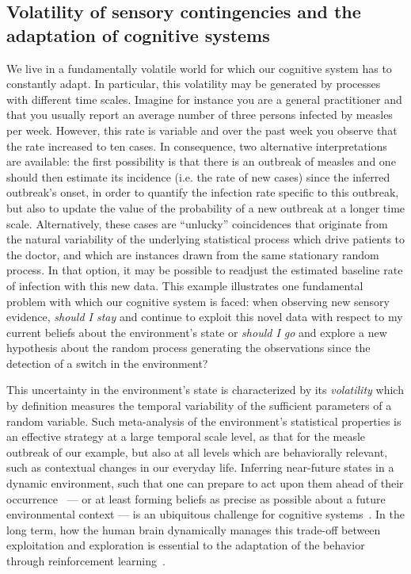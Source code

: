 \documentclass[10pt,letterpaper]{article}
\newcommand{\citep}[1]{\cite{#1}}
\newcommand{\LP}[1]{\textbf{\textcolor{red}{[LP: #1]}}}
\newcommand{\Rone}[1]{\textbf{\textcolor{magenta}{[rev 1: #1]}}}
\begin{document}
\subsection{Volatility of sensory contingencies and the adaptation of cognitive systems}
We live in a fundamentally volatile world for which
our cognitive system has to constantly adapt.
In particular, this volatility may be generated
by processes with different time scales.
Imagine for instance you are a general practitioner and
that you usually report an average number of
three persons infected by measles per week.
However, this rate is variable and
over the past week you observe that the rate increased to ten cases.
In consequence, two alternative interpretations are available:
the first possibility is that there is an outbreak of measles and
one should then estimate its incidence
(i.e. the rate of new cases)
since the inferred outbreak's onset, in order
to quantify the infection rate specific to this outbreak,
but also to update the value of %
the probability of a new outbreak %
at a longer time scale.
Alternatively, these cases are
``unlucky'' coincidences that originate from the natural variability
of the underlying statistical process which drive patients to the doctor,
and which are instances drawn from the same stationary random process.
In that option, it may be possible to readjust
the estimated baseline rate of infection with this new data.
This example illustrates one fundamental problem
with which our cognitive system is faced:
when observing new sensory evidence,
\emph{should I stay} and continue to exploit this novel data
with respect to my current beliefs about the environment's state
or \emph{should I go} and explore a new hypothesis
about the random process generating the observations
since the detection of a switch in the environment?

This uncertainty in the environment's state is characterized by its \emph{volatility}
which by definition measures the temporal variability
of the sufficient parameters of a random variable.
Such meta-analysis of the environment's statistical properties
is an effective strategy at a large temporal scale level,
as that for the measle outbreak of our example,
but also at all levels which are behaviorally relevant,
such as contextual changes in our everyday life.
Inferring near-future states in a dynamic environment,
such that one can prepare to act upon them
ahead of their occurrence~\citep{PerrinetAdamasFriston2014} ---
or at least forming beliefs as precise as possible
about a future environmental context ---
is an ubiquitous challenge for cognitive systems~\citep{Barack16}.
In the long term, how the human brain dynamically manages
this trade-off between exploitation and exploration
is essential to the adaptation
of the behavior through reinforcement learning~\citep{Cohen2007}.
\end{document}
